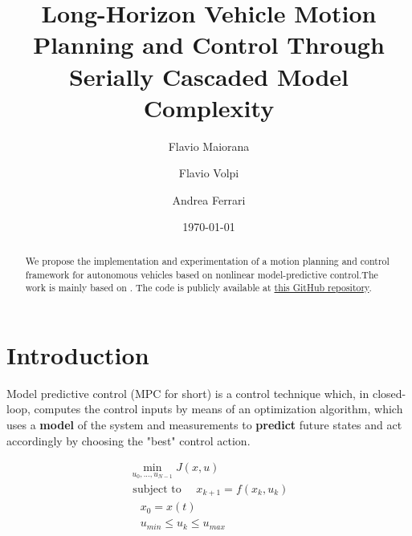 \documentclass[a4paper, onecolumn, 12pt]{article}
\title{Long-Horizon Vehicle Motion Planning and Control Through Serially Cascaded Model Complexity}
\author{Flavio Maiorana \and Flavio Volpi \and Andrea Ferrari}
\date{\today}
\begin{document}
\listoftodos

\maketitle
\begin{abstract}
    We propose the implementation and experimentation of a motion planning and
    control framework for autonomous vehicles based on nonlinear
    model-predictive control.The work is mainly based on \cite{paper}. The code
    is publicly available at
    \href{https://github.com/neverorfrog/vehicle-control}{this GitHub
    repository}. 
\end{abstract}

\newpage
\tableofcontents

\newpage
\section{Introduction}

Model predictive control (MPC for short) is a control technique which, in
closed-loop, computes the control inputs by means of an optimization algorithm,
which uses a \textbf{model} of the system and measurements to \textbf{predict}
future states and act accordingly by choosing the "best" control action. 

\begin{equation}
\begin{aligned}
    \min_{u_0,...,u_{N-1}}{J(x,u)} \\
    \text{ subject to }
        \quad x_{k+1} = f(x_k,u_k) \\
        \quad x_0 = x(t) \\
        \quad u_{min} \leq u_k \leq u_{max}
\end{aligned}
\end{equation}
\end{document}
